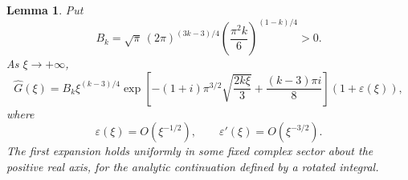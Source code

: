 \documentclass[11pt]{amsart}
\newtheorem{lemma}[theorem]{Lemma}
\theoremstyle{definition}
\theoremstyle{remark}
\numberwithin{equation}{section}
\begin{document}
\begin{lemma}\label{Fourier}
Put
\begin{equation}\label{Bk}
 B_k=\sqrt\pi\,(2\pi)^{(3k-3)/4}
                \left(\frac{\pi^2k}{6}\right)^{(1-k)/4}>0.
\end{equation}
As $\xi\to+\infty$,
\begin{equation}\label{Fourierexp}
 \widehat G(\xi)=B_k\xi^{(k-3)/4}
 \exp\!\left[-(1+i)\pi^{3/2}\sqrt{\frac{2k\xi}{3}}
                 +\frac{(k-3)\pi i}{8}\right](1+\varepsilon(\xi)),
\end{equation}
where
\begin{equation}\label{Fourierderror}
 \varepsilon(\xi)=O(\xi^{-1/2}),\qquad
 \varepsilon'(\xi)=O(\xi^{-3/2}).
\end{equation}
The first expansion holds uniformly in some fixed complex sector about the positive real axis, for the analytic continuation defined by a rotated integral.
\end{lemma}
\end{document}
